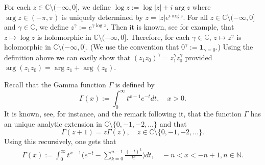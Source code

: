 \documentclass[12pt,a4paper]{amsart}
\theoremstyle{plain}
\theoremstyle{definition}
\numberwithin{equation}{section}
\begin{document}
	For each $z\in \mathbb C\setminus (-\infty,0]$, we define
$
	\log z := \log |z| + i \arg z
$
	where $\arg z \in (-\pi,\pi)$ is uniquely determined by
$
	z = |z|e^{i \arg z}.
$ 	
	For all $z\in \mathbb C\setminus (-\infty,0]$ and $\gamma \in \mathbb C$, we define
$
	z^\gamma := e^{\gamma \log z}.
$
	Then it is known, see \cite[Theorem 6.1]{SteinShakarchi2003Complex} for example, that $z\mapsto \log z$ is holomorphic in $\mathbb C\setminus (-\infty,0]$.
	Therefore, for each $\gamma \in \mathbb C$, $z\mapsto z^\gamma$ is holomorphic in $\mathbb C\setminus (-\infty,0]$. (We use the convention that  $0^\gamma := \mathbf 1_{\gamma = 0}$.)
    Using  the definition above we can easily show that $(z_1z_0)^\gamma = z_1^\gamma z_0^\gamma$ provided $\arg (z_1z_0)=\arg z_1 + \arg(z_0)$.

    Recall that the Gamma function  $\Gamma$ is defined by
\begin{equation}
    \Gamma (x) := \int_0^\infty t^{x-1} e^{-t}dt,
    \quad x>0.
\end{equation}
	It is known, see, for instance, \cite[Theorem 6.1.3]{SteinShakarchi2003Complex} and the remark following it, that the function $\Gamma$ has an unique analytic extension in $\mathbb C\setminus\{0, -1,-2,\dots\}$ and that
\[
	\Gamma(z+1) = z \Gamma(z),\quad z\in \mathbb C\setminus\{0, -1,-2,\dots\}.
\]
	Using this recursively, one gets that
\begin{equation}\begin{split}
\label{eq: definition of Gamma function}
    \Gamma(x)
    := \int_0^\infty t^{x-1} \Big(e^{-t} - \sum_{k=0}^{n-1} \frac{(-t)^k}{k!}\Big) dt,
    \quad -n< x< -n+1, n\in \mathbb N.
\end{split}\end{equation}
\end{document}

